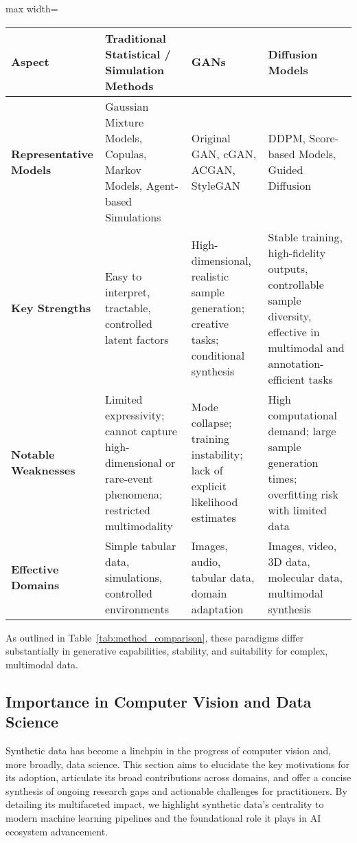 \documentclass[sigconf]{acmart}
\begin{document}
\begin{table*}[htbp]
\centering
\caption{Comparison of Classical, GAN, and Diffusion Approaches to Synthetic Data Generation}
\label{tab:method_comparison}
\begin{adjustbox}{max width=\textwidth}
\begin{tabular}{llll}
\toprule
\textbf{Aspect} & \textbf{Traditional Statistical / Simulation Methods} & \textbf{GANs} & \textbf{Diffusion Models} \\
\midrule
\textbf{Representative Models} & Gaussian Mixture Models, Copulas, Markov Models, Agent-based Simulations & Original GAN, cGAN, ACGAN, StyleGAN & DDPM, Score-based Models, Guided Diffusion \\
\textbf{Key Strengths} & Easy to interpret, tractable, controlled latent factors & High-dimensional, realistic sample generation; creative tasks; conditional synthesis & Stable training, high-fidelity outputs, controllable sample diversity, effective in multimodal and annotation-efficient tasks \\
\textbf{Notable Weaknesses} & Limited expressivity; cannot capture high-dimensional or rare-event phenomena; restricted multimodality & Mode collapse; training instability; lack of explicit likelihood estimates & High computational demand; large sample generation times; overfitting risk with limited data \\
\textbf{Effective Domains} & Simple tabular data, simulations, controlled environments & Images, audio, tabular data, domain adaptation & Images, video, 3D data, molecular data, multimodal synthesis \\
\bottomrule
\end{tabular}
\end{adjustbox}
\end{table*}

As outlined in Table~\ref{tab:method_comparison}, these paradigms differ substantially in generative capabilities, stability, and suitability for complex, multimodal data.

\subsection{Importance in Computer Vision and Data Science}

Synthetic data has become a linchpin in the progress of computer vision and, more broadly, data science. This section aims to elucidate the key motivations for its adoption, articulate its broad contributions across domains, and offer a concise synthesis of ongoing research gaps and actionable challenges for practitioners. By detailing its multifaceted impact, we highlight synthetic data's centrality to modern machine learning pipelines and the foundational role it plays in AI ecosystem advancement.
\end{document}
